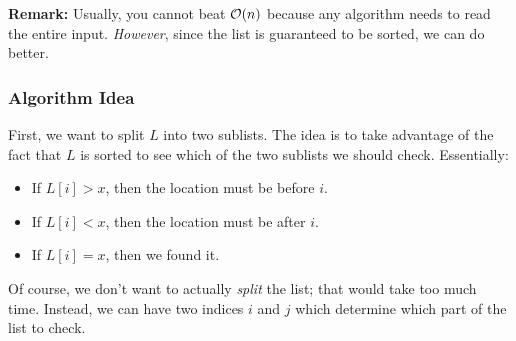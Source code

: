 \documentclass[letterpaper]{article}
\begin{document}
\bigskip 

\textbf{Remark:} Usually, you cannot beat $\mathcal{O}(n)$ because any algorithm needs to read the entire input. \emph{However}, since the list is guaranteed to be sorted, we can do better.

\subsubsection{Algorithm Idea}
First, we want to split $L$ into two sublists. The idea is to take advantage of the fact that $L$ is sorted to see which of the two sublists we should check. Essentially:
\begin{itemize}
    \item If $L[i] > x$, then the location must be before $i$.
    \item If $L[i] < x$, then the location must be after $i$. 
    \item If $L[i] = x$, then we found it. 
\end{itemize}
Of course, we don't want to actually \emph{split} the list; that would take too much time. Instead, we can have two indices $i$ and $j$ which determine which part of the list to check. 
\end{document}
